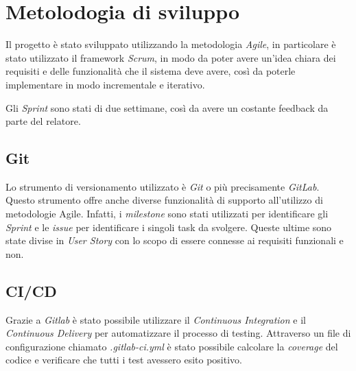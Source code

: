 \section{Metolodogia di sviluppo}
Il progetto è stato sviluppato utilizzando la metodologia \textit{Agile}, in particolare è stato utilizzato il framework \textit{Scrum}, in modo da poter avere un'idea chiara dei requisiti e delle funzionalità che il sistema deve avere, così da poterle implementare in modo incrementale e iterativo. 

Gli \textit{Sprint} sono stati di due settimane, così da avere un costante feedback da parte del relatore.

\subsection{Git}
Lo strumento di versionamento utilizzato è \textit{Git} o più precisamente \textit{GitLab}. Questo strumento offre anche diverse funzionalità di supporto all'utilizzo di metodologie Agile. Infatti, i \textit{milestone} sono stati utilizzati per identificare gli \textit{Sprint} e le \textit{issue} per identificare i singoli task da svolgere. Queste ultime sono state divise in \textit{User Story} con lo scopo di essere connesse ai requisiti funzionali e non.

\subsection{CI/CD}

Grazie a \textit{Gitlab} è stato possibile utilizzare il \textit{Continuous Integration} e il \textit{Continuous Delivery} per automatizzare il processo di testing. Attraverso un file di configurazione chiamato \textit{.gitlab-ci.yml} è stato possibile calcolare la \textit{coverage} del codice e verificare che tutti i test avessero esito positivo. 